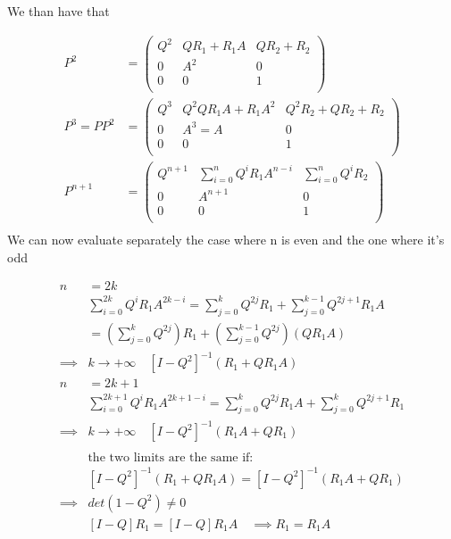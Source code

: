 We than have that

\begin{equation}\begin{split}
	P^2&=\begin{pmatrix}
		Q^2 & Q R_1 + R_1 A & Q R_2 + R_2\\
		0 & A^2  & 0 \\
		0 & 0  & 1 \\
	\end{pmatrix}
	\\
	P^{3} = P P^2 &=\begin{pmatrix}
		Q^3 & Q^2 Q R_1 A + R_1 A^2 & Q^2 R_2 + Q R_2 +R_2\\
		0 & A^3=A  & 0 \\
		0 & 0  & 1 \\
	\end{pmatrix}\\
	P^{n+1}&=\begin{pmatrix}
		Q^{n+1} & \sum\limits_{i=0}^n Q^i R_1 A^{n-i} & \sum\limits_{i=0}^n Q^i R_2\\
		0 & A^{n+1}  & 0 \\
		0 & 0  & 1 \\
	\end{pmatrix}\\
\end{split}\end{equation}
We can now evaluate separately the case where n is even and the one where it's odd

\begin{equation}\begin{split}
	n &= 2 k \\
	&\sum\limits_{i=0}^{2k}Q^i R_1 A^{2k-i} = \sum\limits_{j=0}^{k}Q^{2j} R_1 + \sum\limits_{j=0}^{k-1}Q^{2j+1} R_1 A \\
	&=\left(\sum\limits_{j=0}^{k}Q^{2j} \right) R_1 + \left(\sum\limits_{j=0}^{k-1}Q^{2j} \right) (Q R_1 A)\\
	\implies & k \to +\infty \quad [I - Q^2]^{-1} (R_1 + Q R_1 A)\\
	n &= 2 k + 1 \\
	&\sum\limits_{i=0}^{2k+1}Q^i R_1 A^{2k+1-i} = \sum\limits_{j=0}^{k}Q^{2j} R_1 A + \sum\limits_{j=0}^{k}Q^{2j+1} R_1 \\
	\implies & k \to +\infty \quad [I - Q^2]^{-1} (R_1 A + Q R_1 ) \\
	\\
	&\text{the two limits are the same if: }\\
	& [I - Q^2]^{-1} (R_1 + Q R_1 A) = [I - Q^2]^{-1} (R_1 A + Q R_1 )\\
	\implies & det(1-Q^2)\neq 0\\
	& [I-Q ] R_1 = [I-Q] R_1 A \quad \implies R_1 = R_1 A
\end{split}\end{equation}


